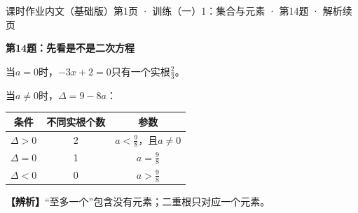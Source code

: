 \documentclass[UTF8,10pt,aspectratio=169]{ctexbeamer}
\newcommand{\Tip}[1]{\par\vspace{0.2cm}\textbf{【辨析】}#1}
\newcommand{\Source}[1]{{\scriptsize\color{gray}#1}\par\vspace{0.25cm}}
\begin{document}
\begin{frame}
\Source{课时作业内文（基础版）第1页 · 训练（一）1：集合与元素 · 第14题 · 解析续页}

\textbf{第14题：先看是不是二次方程}
\par\vspace{0.3cm}
当$a=0$时，$-3x+2=0$只有一个实根$\frac23$。
\pause\par\vspace{0.3cm}
当$a\ne0$时，$\Delta=9-8a$：
\begin{center}\begin{tabular}{c|c|c}
条件 & 不同实根个数 & 参数\\\hline
$\Delta>0$ & 2 & $a<\frac98$，且$a\ne0$\\[0.15cm]
$\Delta=0$ & 1 & $a=\frac98$\\[0.15cm]
$\Delta<0$ & 0 & $a>\frac98$
\end{tabular}\end{center}
\pause
\Tip{“至多一个”包含没有元素；二重根只对应一个元素。}

\end{frame}
\end{document}
